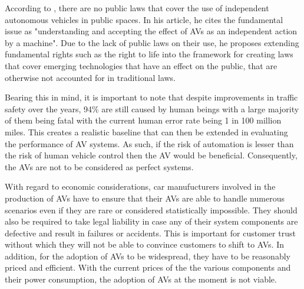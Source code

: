 According to \cite{gasser2016fundamental}, there are no public laws that cover the  use of independent autonomous vehicles in public spaces. In his article, he cites the fundamental issue as "understanding and accepting the effect of AVs as an independent action by a machine". Due to the lack of public laws on their use, he proposes extending fundamental rights such as the right to life into the framework for creating laws that cover emerging technologies that have an effect on the public, that are otherwise not accounted for in traditional laws. 

Bearing this in mind, it is important to note that despite improvements in traffic safety over the years, 94\% are still caused by human beings with a large majority of them being fatal with the current human error rate being 1 in 100 million miles. This creates a realistic baseline that can then be extended in evaluating the performance of AV systems. As such, if the risk of automation is lesser than the risk of human vehicle control then the AV would be beneficial. Consequently, the AVs are not to be considered as perfect systems.

With regard to economic considerations, car manufucturers involved in the production of AVs have to ensure that their AVs are able to handle numerous scenarios even if they are rare or considered statistically impossible. They should also be required to take legal liability in case any of their system components are defective and result in failures or accidents. This is important for customer trust without which they will not be able to convince customers to shift to AVs. In addition, for the adoption of AVs to be widespread, they have to be reasonably priced and efficient. With the current prices of the the various components and their power consumption, the adoption of AVs at the moment is not viable. 




